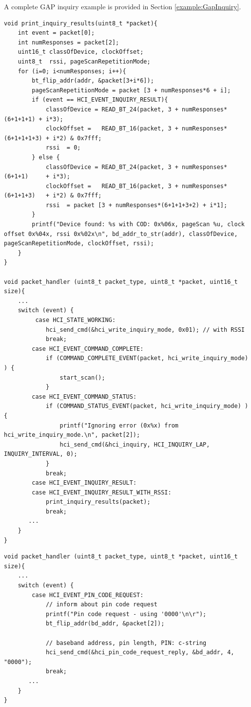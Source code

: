 A complete GAP inquiry example is provided in Section \ref{example:GapInquiry}.

\begin{lstlisting}[float, caption=Discovering remote Bluetooth devices., label=DiscoverDevices]
void print_inquiry_results(uint8_t *packet){
    int event = packet[0];
    int numResponses = packet[2];
    uint16_t classOfDevice, clockOffset;
    uint8_t  rssi, pageScanRepetitionMode;
    for (i=0; i<numResponses; i++){
        bt_flip_addr(addr, &packet[3+i*6]);
        pageScanRepetitionMode = packet [3 + numResponses*6 + i];
        if (event == HCI_EVENT_INQUIRY_RESULT){
            classOfDevice = READ_BT_24(packet, 3 + numResponses*(6+1+1+1) + i*3);
            clockOffset =   READ_BT_16(packet, 3 + numResponses*(6+1+1+1+3) + i*2) & 0x7fff;
            rssi  = 0;
        } else {
            classOfDevice = READ_BT_24(packet, 3 + numResponses*(6+1+1)     + i*3);
            clockOffset =   READ_BT_16(packet, 3 + numResponses*(6+1+1+3)   + i*2) & 0x7fff;
            rssi  = packet [3 + numResponses*(6+1+1+3+2) + i*1];
        }
        printf("Device found: %s with COD: 0x%06x, pageScan %u, clock offset 0x%04x, rssi 0x%02x\n", bd_addr_to_str(addr), classOfDevice, pageScanRepetitionMode, clockOffset, rssi);
    }
}

void packet_handler (uint8_t packet_type, uint8_t *packet, uint16_t size){
    ...
    switch (event) {
         case HCI_STATE_WORKING:
            hci_send_cmd(&hci_write_inquiry_mode, 0x01); // with RSSI
            break;
        case HCI_EVENT_COMMAND_COMPLETE:
            if (COMMAND_COMPLETE_EVENT(packet, hci_write_inquiry_mode) ) {
                start_scan();
            }
        case HCI_EVENT_COMMAND_STATUS:
            if (COMMAND_STATUS_EVENT(packet, hci_write_inquiry_mode) ) {
                printf("Ignoring error (0x%x) from hci_write_inquiry_mode.\n", packet[2]);
                hci_send_cmd(&hci_inquiry, HCI_INQUIRY_LAP, INQUIRY_INTERVAL, 0);
            }
            break;
        case HCI_EVENT_INQUIRY_RESULT:
        case HCI_EVENT_INQUIRY_RESULT_WITH_RSSI:
            print_inquiry_results(packet);
            break;
       ...
    }
}
\end{lstlisting}

\begin{lstlisting}[caption=Answering authentication request with PIN 0000., label=PinCodeRequest]
void packet_handler (uint8_t packet_type, uint8_t *packet, uint16_t size){
    ...
    switch (event) {
        case HCI_EVENT_PIN_CODE_REQUEST:
            // inform about pin code request
            printf("Pin code request - using '0000'\n\r");
            bt_flip_addr(bd_addr, &packet[2]);
            
            // baseband address, pin length, PIN: c-string
            hci_send_cmd(&hci_pin_code_request_reply, &bd_addr, 4, "0000");
            break;
       ...
    }
}
\end{lstlisting}
